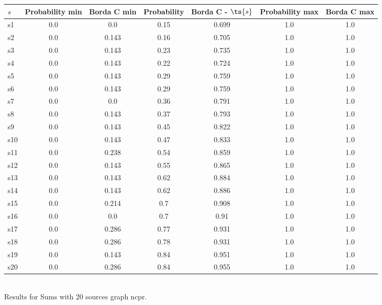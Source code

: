 \documentclass{article}
\begin{document}
\noindent\begin{tabular}{|l|c|c|c|c|c|c|}
\hline
$s$& Probability min & Borda C min & Probability & Borda C - $\ts{s}$ & Probability max & Borda C max\\
\hline
s1 &0.0 & 0.0 & 0.15 & 0.699 & 1.0 & 1.0\\
\hline
s2 &0.0 & 0.143 & 0.16 & 0.705 & 1.0 & 1.0\\
\hline
s3 &0.0 & 0.143 & 0.23 & 0.735 & 1.0 & 1.0\\
\hline
s4 &0.0 & 0.143 & 0.22 & 0.724 & 1.0 & 1.0\\
\hline
s5 &0.0 & 0.143 & 0.29 & 0.759 & 1.0 & 1.0\\
\hline
s6 &0.0 & 0.143 & 0.29 & 0.759 & 1.0 & 1.0\\
\hline
s7 &0.0 & 0.0 & 0.36 & 0.791 & 1.0 & 1.0\\
\hline
s8 &0.0 & 0.143 & 0.37 & 0.793 & 1.0 & 1.0\\
\hline
s9 &0.0 & 0.143 & 0.45 & 0.822 & 1.0 & 1.0\\
\hline
s10 &0.0 & 0.143 & 0.47 & 0.833 & 1.0 & 1.0\\
\hline
s11 &0.0 & 0.238 & 0.54 & 0.859 & 1.0 & 1.0\\
\hline
s12 &0.0 & 0.143 & 0.55 & 0.865 & 1.0 & 1.0\\
\hline
s13 &0.0 & 0.143 & 0.62 & 0.884 & 1.0 & 1.0\\
\hline
s14 &0.0 & 0.143 & 0.62 & 0.886 & 1.0 & 1.0\\
\hline
s15 &0.0 & 0.214 & 0.7 & 0.908 & 1.0 & 1.0\\
\hline
s16 &0.0 & 0.0 & 0.7 & 0.91 & 1.0 & 1.0\\
\hline
s17 &0.0 & 0.286 & 0.77 & 0.931 & 1.0 & 1.0\\
\hline
s18 &0.0 & 0.286 & 0.78 & 0.931 & 1.0 & 1.0\\
\hline
s19 &0.0 & 0.143 & 0.84 & 0.951 & 1.0 & 1.0\\
\hline
s20 &0.0 & 0.286 & 0.84 & 0.955 & 1.0 & 1.0\\
\hline
\end{tabular}\\

\noindent Results for Sums with 20 sources graph ncpr.
\end{document}
